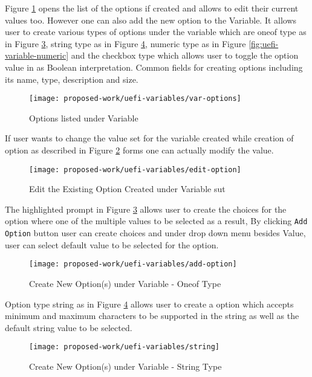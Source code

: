 Figure \ref{fig:uefi-variable-var-options} opens the list of the options if created and allows to edit their current values too. However one can also add the new option to the Variable. It allows user to create various types of options under the variable which are oneof type as in Figure \ref{fig:uefi-variable-add-option}, string type as in Figure \ref{fig:uefi-variable-string}, numeric type as in Figure \ref{fig:uefi-variable-numeric} and the checkbox type which allows user to toggle the option value in as Boolean interpretation. Common fields for creating options including its name, type, description and size.
\begin{figure}[!htbp]
	\centering
	\texttt{[image: proposed-work/uefi-variables/var-options]}
	\caption{Options listed under Variable}\label{fig:uefi-variable-var-options}
\end{figure}

If user wants to change the value set for the variable created while creation of option as described in Figure \ref{fig:uefi-variable-edit-option} forms one can actually modify the value.
\begin{figure}[!htbp]
	\centering
	\texttt{[image: proposed-work/uefi-variables/edit-option]}
	\caption{Edit the Existing Option Created under Variable \gls{sut}}\label{fig:uefi-variable-edit-option}
\end{figure}

The highlighted prompt in Figure \ref{fig:uefi-variable-add-option} allows user to create the choices for the option where one of the multiple values to be selected as a result, By clicking \verb|Add Option| button user can create choices and under drop down menu besides Value, user can select default value to be selected for the option. 
\begin{figure}[!htbp]
	\centering
	\texttt{[image: proposed-work/uefi-variables/add-option]}
	\caption{Create New Option(s) under Variable - Oneof Type}\label{fig:uefi-variable-add-option}
\end{figure}

Option type string as in Figure \ref{fig:uefi-variable-string} allows user to create a option which accepts minimum and maximum characters to be supported in the string as well as the default string value to be selected. 
\begin{figure}[!htbp]
	\centering
	\texttt{[image: proposed-work/uefi-variables/string]}
	\caption{Create New Option(s) under Variable - String Type}\label{fig:uefi-variable-string}
\end{figure}

